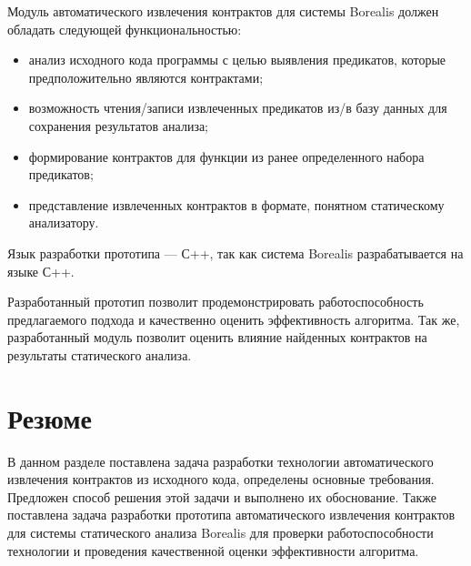Модуль автоматического извлечения контрактов для системы Borealis должен обладать следующей функциональностью:
\begin{itemize}
\item анализ исходного кода программы с целью выявления предикатов, которые предположительно являются контрактами;
\item возможность чтения/записи извлеченных предикатов из/в базу данных для сохранения результатов анализа;
\item формирование контрактов для функции из ранее определенного набора предикатов;
\item представление извлеченных контрактов в формате, понятном статическому анализатору.
\end{itemize}
Язык разработки прототипа --- С++\cite{languageC++}, так как система Borealis разрабатывается на языке С++.

Разработанный прототип позволит продемонстрировать работоспособность предлагаемого подхода и качественно оценить эффективность алгоритма. Так же, разработанный модуль позволит оценить влияние найденных контрактов на результаты статического анализа.

\section{Резюме}
В данном разделе поставлена задача разработки технологии автоматического извлечения контрактов из исходного кода, определены основные требования. Предложен способ решения этой задачи и выполнено их обоснование. Также поставлена задача разработки прототипа автоматического извлечения контрактов для системы статического анализа Borealis для проверки работоспособности технологии и проведения качественной оценки эффективности алгоритма. 